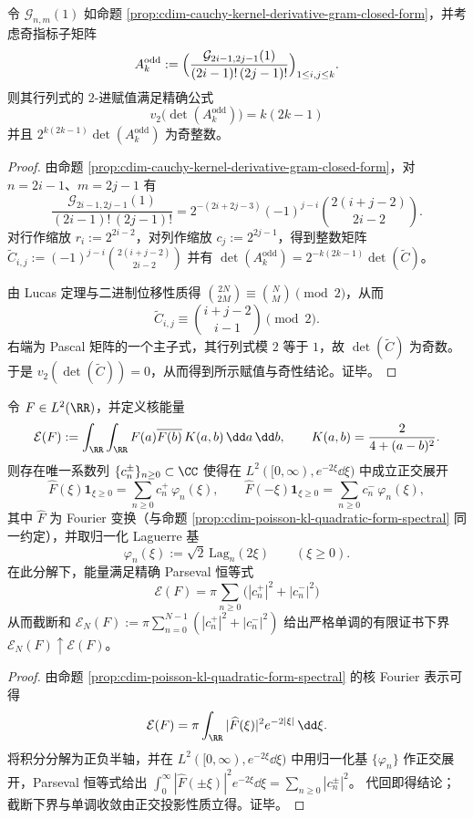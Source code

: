 \begin{proposition}\label{prop:cdim-kernel-odd-gram-v2-determinant}
令 \(\mathcal G_{n,m}(1)\) 如命题 \ref{prop:cdim-cauchy-kernel-derivative-gram-closed-form}，并考虑奇指标子矩阵
\[
A_k^{\mathrm{odd}}
:=\Bigl(\frac{\mathcal G_{2i-1,2j-1}(1)}{(2i-1)!\,(2j-1)!}\Bigr)_{1\le i,j\le k}.
\]
则其行列式的 \(2\)-进赋值满足精确公式
\[
\boxed{\;
v_2\!\bigl(\det(A_k^{\mathrm{odd}})\bigr)=k(2k-1)\;}
\]
并且 \(2^{k(2k-1)}\det(A_k^{\mathrm{odd}})\) 为奇整数。
\end{proposition}
\begin{proof}
由命题 \ref{prop:cdim-cauchy-kernel-derivative-gram-closed-form}，对 \(n=2i-1\)、\(m=2j-1\) 有
\[
\frac{\mathcal G_{2i-1,2j-1}(1)}{(2i-1)!\,(2j-1)!}
=2^{-(2i+2j-3)}(-1)^{j-i}\binom{2(i+j-2)}{2i-2}.
\]
对行作缩放 \(r_i:=2^{2i-2}\)，对列作缩放 \(c_j:=2^{2j-1}\)，得到整数矩阵
\(
\widetilde C_{i,j}:=(-1)^{j-i}\binom{2(i+j-2)}{2i-2}
\)
并有 \(\det(A_k^{\mathrm{odd}})=2^{-k(2k-1)}\det(\widetilde C)\)。
\par
由 Lucas 定理与二进制位移性质得 \(\binom{2N}{2M}\equiv \binom{N}{M}\pmod 2\)，从而
\[
\widetilde C_{i,j}\equiv \binom{i+j-2}{i-1}\pmod 2.
\]
右端为 Pascal 矩阵的一个主子式，其行列式模 \(2\) 等于 \(1\)，故 \(\det(\widetilde C)\) 为奇数。
于是 \(v_2(\det(\widetilde C))=0\)，从而得到所示赋值与奇性结论。证毕。
\end{proof}

\begin{proposition}\label{prop:cdim-kernel-energy-laguerre-parseval}
令 \(F\in L^2(\RR)\)，并定义核能量
\[
\mathcal E(F):=\int_{\RR}\int_{\RR}F(a)\overline{F(b)}\,K(a,b)\,\dd a\,\dd b,
\qquad
K(a,b)=\frac{2}{4+(a-b)^2}.
\]
则存在唯一系数列 \(\{c_n^\pm\}_{n\ge 0}\subset\CC\) 使得在 \(L^2([0,\infty),e^{-2\xi}\dd\xi)\) 中成立正交展开
\[
\widehat F(\xi)\mathbf 1_{\xi\ge 0}=\sum_{n\ge 0}c_n^+\,\varphi_n(\xi),
\qquad
\widehat F(-\xi)\mathbf 1_{\xi\ge 0}=\sum_{n\ge 0}c_n^-\,\varphi_n(\xi),
\]
其中 \(\widehat F\) 为 Fourier 变换（与命题 \ref{prop:cdim-poisson-kl-quadratic-form-spectral} 同一约定），并取归一化 Laguerre 基
\[
\varphi_n(\xi):=\sqrt{2}\,\mathrm{Lag}_n(2\xi)\qquad(\xi\ge 0).
\]
在此分解下，能量满足精确 Parseval 恒等式
\[
\boxed{\;
\mathcal E(F)=\pi\sum_{n\ge 0}\bigl(|c_n^+|^2+|c_n^-|^2\bigr)\;}
\]
从而截断和
\(
\mathcal E_N(F):=\pi\sum_{n=0}^{N-1}(|c_n^+|^2+|c_n^-|^2)
\)
给出严格单调的有限证书下界 \(\mathcal E_N(F)\uparrow \mathcal E(F)\)。
\end{proposition}
\begin{proof}
由命题 \ref{prop:cdim-poisson-kl-quadratic-form-spectral} 的核 Fourier 表示可得
\[
\mathcal E(F)=\pi\int_{\RR}|\widehat F(\xi)|^2e^{-2|\xi|}\,\dd\xi.
\]
将积分分解为正负半轴，并在 \(L^2([0,\infty),e^{-2\xi}\dd\xi)\) 中用归一化基 \(\{\varphi_n\}\) 作正交展开，Parseval 恒等式给出
\(
\int_0^\infty |\widehat F(\pm\xi)|^2e^{-2\xi}\dd\xi=\sum_{n\ge 0}|c_n^\pm|^2
\)。
代回即得结论；截断下界与单调收敛由正交投影性质立得。证毕。
\end{proof}


